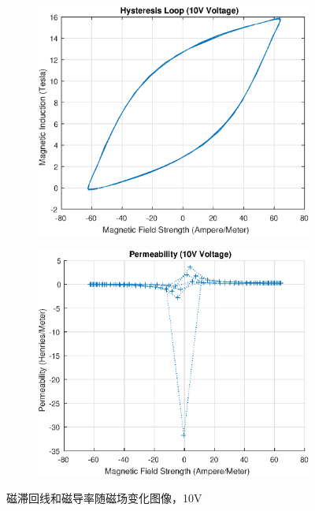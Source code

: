 \documentclass{ctexart}
\begin{document}
\begin{figure}[H]
  \centering
  \begin{subfigure}{0.48\linewidth}
    \includegraphics[width=\linewidth]{LabVIEW使用基础/数据处理/HysteresisLoop_10V.eps}
  \end{subfigure}
  \begin{subfigure}{0.48\linewidth}
    \includegraphics[width=\linewidth]{LabVIEW使用基础/数据处理/Permeability_10V.eps}
  \end{subfigure}
  \caption{磁滞回线和磁导率随磁场变化图像，10V}
\end{figure}
\end{document}
